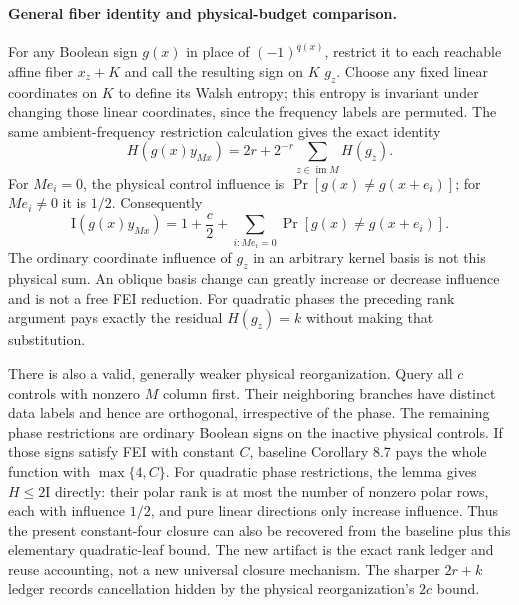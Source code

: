 \documentclass[11pt]{article}
\newcommand{\I}{\mathrm I}
\begin{document}
\paragraph{General fiber identity and physical-budget comparison.}
For any Boolean sign $g(x)$ in place of $(-1)^{q(x)}$, restrict it to
each reachable affine fiber $x_z+K$ and call the resulting sign on $K$
$g_z$. Choose any fixed linear coordinates on $K$ to define its Walsh
entropy; this entropy is invariant under changing those linear coordinates,
since the frequency labels are permuted. The same ambient-frequency
restriction calculation gives the exact identity
\[
 H(g(x)y_{Mx})=2r+2^{-r}\sum_{z\in\operatorname{im}M}H(g_z).
\]
For $M e_i=0$, the physical control influence is $\Pr[g(x)\ne g(x+e_i)]$;
for $M e_i\ne0$ it is $1/2$. Consequently
\[
 \I(g(x)y_{Mx})=1+\frac c2+
 \sum_{i:M e_i=0}\Pr[g(x)\ne g(x+e_i)].
\]
The ordinary coordinate influence of $g_z$ in an arbitrary kernel basis
is not this physical sum. An oblique basis change can greatly increase
or decrease influence and is not a free FEI reduction. For quadratic
phases the preceding rank argument pays exactly the residual
$H(g_z)=k$ without making that substitution.

There is also a valid, generally weaker physical reorganization. Query
all $c$ controls with nonzero $M$ column first. Their neighboring branches
have distinct data labels and hence are orthogonal, irrespective of the
phase. The remaining phase restrictions are ordinary Boolean signs on
the inactive physical controls. If those signs satisfy FEI with constant
$C$, baseline Corollary 8.7 pays the whole function with $\max\{4,C\}$.
For quadratic phase restrictions, the lemma gives $H\le2\I$ directly:
their polar rank is at most the number of nonzero polar rows, each
with influence $1/2$, and pure linear directions only increase influence.
Thus the present constant-four closure can also be recovered from the
baseline plus this elementary quadratic-leaf bound. The new artifact is
the exact rank ledger and reuse accounting, not a new universal closure
mechanism. The sharper $2r+k$ ledger records cancellation hidden by the
physical reorganization's $2c$ bound.
\end{document}

